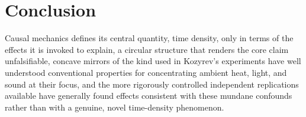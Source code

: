 \documentclass[11pt]{article}
\begin{document}
\section{Conclusion}

Causal mechanics defines its central quantity, time density, only in terms of the effects it is invoked to explain, a circular structure that renders the core claim unfalsifiable, concave mirrors of the kind used in Kozyrev's experiments have well understood conventional properties for concentrating ambient heat, light, and sound at their focus, and the more rigorously controlled independent replications available have generally found effects consistent with these mundane confounds rather than with a genuine, novel time-density phenomenon.
\end{document}
